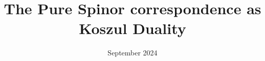 \documentclass[11pt]{article}
\begin{document}
\title{The Pure Spinor correspondence as Koszul Duality}

\pubnum{
}

\date{September 2024}

\maketitle




\printbibliography[heading=bibintoc]
\end{document}

